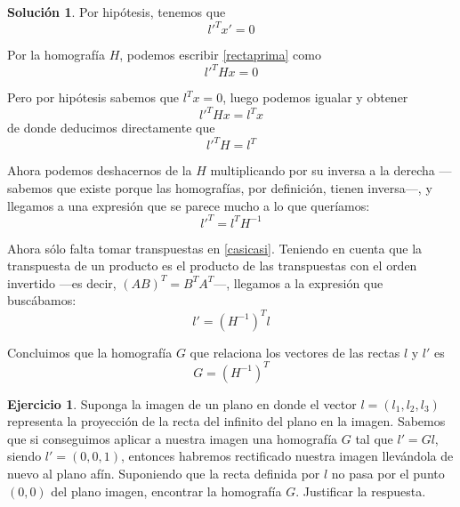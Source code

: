 \documentclass[a4paper, 11pt]{article}
\theoremstyle{definition}
\newtheorem{ejercicio}{Ejercicio}
\newtheorem*{solucion}{Solución}
\theoremstyle{theorem}
\begin{document}
  \begin{solucion}
      Por hipótesis, tenemos que
      \begin{equation}
          l'^Tx'=0 \label{rectaprima}
      \end{equation}

      Por la homografía $H$, podemos escribir \ref{rectaprima} como
      \begin{equation*}
          l'^THx=0 \label{rectah}
      \end{equation*}

      Pero por hipótesis sabemos que $l^Tx = 0$, luego podemos igualar y obtener
      \begin{equation*}
          l'^THx = l^Tx
      \end{equation*}
      de donde deducimos directamente que
      \begin{equation*}
          l'^TH = l^T \label{casi}
      \end{equation*}

      Ahora podemos deshacernos de la $H$ multiplicando por su inversa a la derecha ---sabemos que existe porque las homografías, por definición, tienen inversa---, y llegamos a una expresión que se parece mucho a lo que queríamos:
      \begin{equation}
          l'^T = l^TH^{-1} \label{casicasi}
      \end{equation}

      Ahora sólo falta tomar transpuestas en \ref{casicasi}. Teniendo en cuenta que la transpuesta de un producto es el producto de las transpuestas con el orden invertido ---es decir, $(AB)^T = B^TA^T$---, llegamos a la expresión que buscábamos:
      \begin{equation*}
          l' = (H^{-1})^Tl
      \end{equation*}

      Concluimos que la homografía $G$ que relaciona los vectores de las rectas $l$ y $l'$ es
      \[
      G = (H^{-1})^T
      \]
  \end{solucion}

  \begin{ejercicio}
      Suponga la imagen de un plano en donde el vector $l=(l_1,l_2,l_3)$ representa la proyección de la recta del infinito del plano en la imagen. Sabemos que si conseguimos aplicar a nuestra imagen una homografía $G$ tal que $l'= Gl$, siendo $l' =(0,0,1)$, entonces habremos rectificado nuestra imagen llevándola de nuevo al plano afín. Suponiendo que la recta definida por $l$ no pasa por el punto $(0,0)$ del plano imagen, encontrar la homografía $G$. Justificar la respuesta.
  \end{ejercicio}
\end{document}
